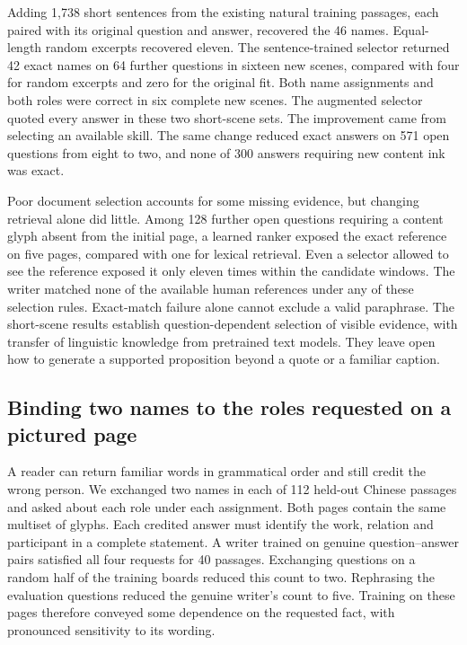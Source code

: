 \documentclass[12pt,a4paper]{article}
\providecommand{\DIFadd}[1]{{\protect\color{blue} \sf #1}} %
\begin{document}
\DIFadd{Adding 1,738 short sentences from the existing natural training passages, each paired with its original question and answer, recovered the 46 names. Equal-length random excerpts recovered eleven. The sentence-trained selector returned 42 exact names on 64 further questions in sixteen new scenes, compared with four for random excerpts and zero for the original fit. Both name assignments and both roles were correct in six complete new scenes. The augmented selector quoted every answer in these two short-scene sets. The improvement came from selecting an available skill. The same change reduced exact answers on 571 open questions from eight to two, and none of 300 answers requiring new content ink was exact.
}

\DIFadd{Poor document selection accounts for some missing evidence, but changing retrieval alone did little. Among 128 further open questions requiring a content glyph absent from the initial page, a learned ranker exposed the exact reference on five pages, compared with one for lexical retrieval. Even a selector allowed to see the reference exposed it only eleven times within the candidate windows. The writer matched none of the available human references under any of these selection rules. Exact-match failure alone cannot exclude a valid paraphrase. The short-scene results establish question-dependent selection of visible evidence, with transfer of linguistic knowledge from pretrained text models. They leave open how to generate a supported proposition beyond a quote or a familiar caption.
}

\subsection*{\DIFadd{Binding two names to the roles requested on a pictured page}}
\DIFadd{A reader can return familiar words in grammatical order and still credit the wrong person. We exchanged two names in each of 112 held-out Chinese passages and asked about each role under each assignment. Both pages contain the same multiset of glyphs. Each credited answer must identify the work, relation and participant in a complete statement. A writer trained on genuine question--answer pairs satisfied all four requests for 40 passages. Exchanging questions on a random half of the training boards reduced this count to two. Rephrasing the evaluation questions reduced the genuine writer's count to five. Training on these pages therefore conveyed some dependence on the requested fact, with pronounced sensitivity to its wording.
}
\end{document}
